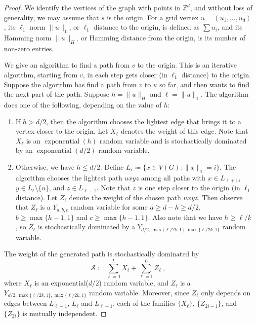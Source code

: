 \documentclass{patmorin}
\DeclareMathOperator{\exponential}{exponential}
\begin{document}
\begin{proof}
We identify the vertices of the graph with points in $\mathbb{Z}^d$, and without loss of generality, we may assume that $s$ is the origin.
For a grid vertex $u=(u_1,\ldots,u_d)$,
its $\ell_1$ norm $\|u\|_1$, or $\ell_1$ distance to the origin, is defined as $\sum u_i$,
and its Hamming norm $\|u\|_H$, or Hamming distance from the origin, is its number of non-zero entries.

We give an algorithm to find a path from $v$ to the origin.
This is an iterative algorithm, starting from $v$,
in each step gets closer (in $\ell_1$ distance) to the origin.
Suppose the algorithm has find a path from $v$ to $u$ so far, and then wants to find the next part of the path.
Suppose $h=\|u\|_H$ and $\ell = \|u\|_{1}$.
The algorithm does one of the following, depending on the value of $h$:
\begin{enumerate}
  \item If $h > d/2$, then the algorithm chooses the lightest 
    edge that brings it to a vertex closer to the origin. 
    Let $X_{\ell}$ denotes the weight of this edge. Note that $X_{\ell}$ is an $\exponential(h)$ random variable and is stochastically dominated by an $\exponential(d/2)$ random variable.

  \item Otherwise, we have $h\leq d/2$.
  Define $L_i \coloneqq \{x\in V(G): \|x\|_1=i\}$.
    The algorithm chooses the lightest path $uxyz$ among
    all paths with $x\in L_{\ell+1}$,  $y\in L_{\ell}\setminus\{u\}$,
    and $z\in L_{\ell-1}$.
    Note that $z$ is one step closer to the origin (in $\ell_1$ distance).
    Let $Z_{\ell}$ denote the weight of the chosen path $uxyz$.
    Then observe that $Z_{\ell}$ is a $Y_{a,b,c}$ random variable for some $a\geq d-h\geq d/2$, $b\geq \max\{h-1,1\}$ and $c\geq \max\{h-1,1\}$.
    Also note that we have $h \geq \ell/k$,
    so $Z_{\ell}$ is stochastically dominated by
    a $Y_{d/2,\max\{\ell/2k,1\},\max\{\ell/2k,1\}}$ random variable.
 \end{enumerate}
The weight of the generated path is stochastically dominated by
\[
\mathcal S \coloneqq 
\sum_{\ell=1}^{L} X_{\ell} +
\sum_{\ell=1}^{L} Z_{\ell} \:,
\]
where $X_{\ell}$ is an exponential($d/2$) random variable,
and $Z_{\ell}$ is a $Y_{d/2,\max\{\ell/2k,1\},\max\{\ell/2k,1\}}$
random variable.
Moreover, since $Z_{\ell}$ only depends on edges 
between $L_{\ell-1}$, $L_{\ell}$ and $L_{\ell+1}$,
each of the families
$\{X_{\ell}\}$,
$\{Z_{2i-1}\}$,
and 
$\{Z_{2i}\}$
is mutually independent.


\end{proof}
\end{document}
